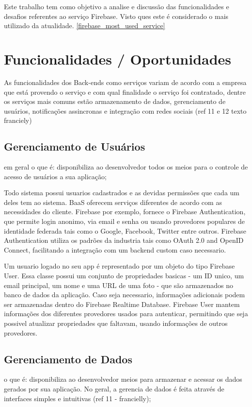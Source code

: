 	Este trabalho tem como objetivo a analise e discussão das funcionalidades e desafios referentes ao serviço Firebase. Visto ques este é considerado o mais utilizado da atualidade. \ref{firebase_most_used_service}

\section{Funcionalidades / Oportunidades}
\label{sec:functionality}
	As funcionalidades dos Back-ends como serviços variam de acordo com a empresa que está provendo o serviço e com qual finalidade o serviço foi contratado, dentre os serviços mais comuns estão armazenamento de dados, gerenciamento de usuários, notificações assincronas e integração com redes sociais (ref 11 e 12 texto franciely)

	\subsection{Gerenciamento de Usuários} %
	\label{subsec:user_management}
	em geral o que é: disponibiliza ao desenvolvedor todos os meios para o controle de acesso de usuários a sua aplicação;
	
	Todo sistema possui usuarios cadastrados e as devidas permissões que cada um deles tem ao sistema. BaaS oferecem serviços diferentes de acordo com as necessidades do cliente. Firebase por exemplo, fornece o Firebase Authentication, que permite login anonimo, via email e senha ou usando provedores populares de identidade federada tais como o Google, Facebook, Twitter entre outros. Firebase Authentication utiliza os padrões da industria tais como OAuth 2.0 and OpenID Connect, facilitando a integração com um backend custom caso necessario.


	Um usuario logado no seu app é representado por um objeto do tipo Firebase User. Essa  classe possui um conjunto de propriedades basicas - um ID unico, um email principal, um nome e uma URL de uma foto - que são armazenados no banco de dados da aplicação. Caso seja necessario, informações adicionais podem ser armazenadas dentro do Firebase Realtime Database. Firebase User mantem informações dos diferentes provedores usados para autenticar, permitindo que seja possivel atualizar propriedades que faltavam, usando informações de outros provedores.

	\subsection{Gerenciamento de Dados}
	\label{subsec:data_management}
	o que é: disponibiliza ao desenvolvedor meios para armazenar e acessar os dados gerados por sua aplicação. No geral, a gerencia de dados é feita através de interfaces simples e intuitivas (ref 11 - francielly);
	

